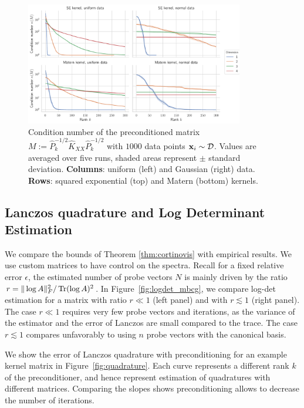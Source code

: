\documentclass{article}
\begin{document}
\begin{figure}
    \centering
    \includegraphics[width=0.85\textwidth]{report/res/pivchol_cond.pdf}
    \caption{Condition number of the preconditioned matrix $M := \widehat P^{-1/2}_k \widehat K_{XX} \widehat P^{-1/2}_k$ with $1000$ data points $\boldsymbol{\mathbf{x}}_i \sim \mathcal D$. Values are averaged over five runs, shaded areas represent $\pm$ standard deviation. \textbf{Columns}: uniform (left) and Gaussian (right) data. \textbf{Rows}: squared exponential (top) and Matern (bottom) kernels. }
    \label{fig:pivchol_cond}
\end{figure}




\subsection{Lanczos quadrature and Log Determinant Estimation}

We compare the bounds of Theorem \ref{thm:cortinovis} with empirical results. We use custom matrices to have control on the spectra. 
Recall for a fixed relative error $\epsilon$, the estimated number of probe vectors $N$ is mainly driven by the ratio $r = \Vert \log A \Vert_F^2 / \operatorname{Tr}(\log A)^2$. 
In Figure~\ref{fig:logdet_mbcg}, we compare log-det estimation for a matrix with ratio $r \ll 1$ (left panel) and with $r \lesssim 1$ (right panel).
The case $r \ll 1$ requires very few probe vectors and iterations, as the variance of the estimator and the error of Lanczos are small compared to the trace. The case $r \lesssim 1$ compares unfavorably to using $n$ probe vectors with the canonical basis. 

We show the error of Lanczos quadrature with preconditioning for an example kernel matrix in Figure~\ref{fig:quadrature}. 
Each curve represents a different rank $k$ of the preconditioner, and hence represent estimation of quadratures with different matrices. Comparing the slopes shows preconditioning allows to decrease the number of iterations. 
\end{document}
